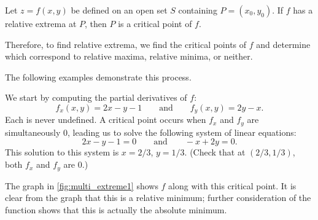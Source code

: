 {Let $z=f(x,y)$ be defined on an open set $S$ containing $P=(x_0,y_0)$. If $f$ has a relative extrema at $P$, then $P$ is a critical point of $f$.}

Therefore, to find relative extrema, we find the critical points of $f$ and determine which correspond to relative maxima, relative minima, or neither.


The following examples demonstrate this process.

{We start by computing the partial derivatives of $f$:
$$f_x(x,y) = 2x-y-1 \qquad \text{and}\qquad f_y(x,y) = 2y-x.$$
Each is never undefined. A critical point occurs when $f_x$ and $f_y$ are simultaneously 0, leading us to solve the following system of linear equations:
$$2x-y-1 = 0\qquad \text{and}\qquad -x+2y = 0.$$
This solution to this system is $x=2/3$, $y=1/3$. (Check that at $(2/3,1/3)$, both $f_x$ and $f_y$ are 0.)

The graph in \autoref{fig:multi_extreme1} shows $f$ along with this critical point. It is clear from the graph that this is a relative minimum; further consideration of the function shows that this is actually the absolute minimum.}

